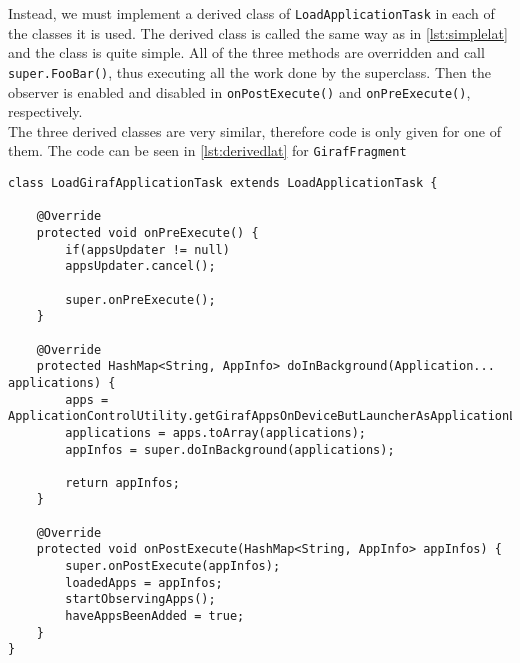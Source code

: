  Instead, we must implement a derived class of \lstinline|LoadApplicationTask| in each of the classes it is used.
 The derived class is called the same way as in \cref{lst:simplelat} and the class is quite simple.
 All of the three methods are overridden and call \lstinline!super.FooBar()!, thus executing all the work done by the superclass.
 Then the observer is enabled and disabled in  \lstinline!onPostExecute()! and \lstinline!onPreExecute()!, respectively.\\
 
 The three derived classes are very similar, therefore code is only given for one of them.
 The code can be seen in \cref{lst:derivedlat} for \lstinline!GirafFragment! 
 
  \begin{lstlisting}[caption={The LoadGirafApplicationTask, derived from LoadApplicationTask. This is the derived class used by GirafFragment to load applications into view. Please note that all comments and the constructor have been removed to make the listing smaller}, label={lst:derivedlat}]
class LoadGirafApplicationTask extends LoadApplicationTask {
	
	@Override
	protected void onPreExecute() {
		if(appsUpdater != null)
		appsUpdater.cancel();
		
		super.onPreExecute();
	}
	
	@Override
	protected HashMap<String, AppInfo> doInBackground(Application... applications) {
		apps = ApplicationControlUtility.getGirafAppsOnDeviceButLauncherAsApplicationList(context);
		applications = apps.toArray(applications);
		appInfos = super.doInBackground(applications);
		
		return appInfos;
	}
	
	@Override
	protected void onPostExecute(HashMap<String, AppInfo> appInfos) {
		super.onPostExecute(appInfos);
		loadedApps = appInfos;
		startObservingApps();
		haveAppsBeenAdded = true;
	}
}
\end{lstlisting}